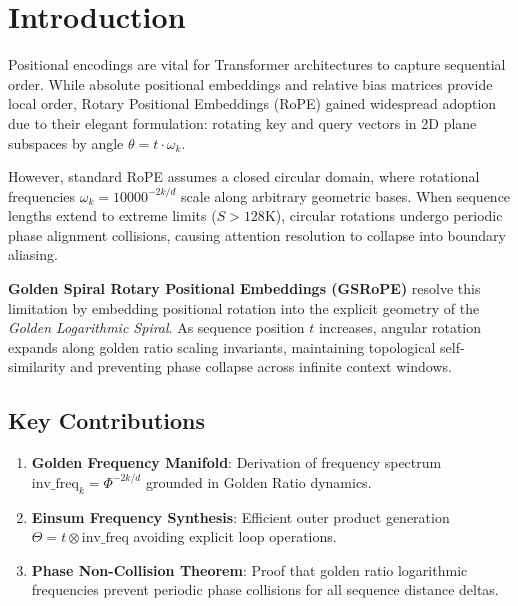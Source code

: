 \section{Introduction}
Positional encodings are vital for Transformer architectures to capture sequential order. While absolute positional embeddings and relative bias matrices provide local order, Rotary Positional Embeddings (RoPE) gained widespread adoption due to their elegant formulation: rotating key and query vectors in 2D plane subspaces by angle $\theta = t \cdot \omega_k$.

However, standard RoPE assumes a closed circular domain, where rotational frequencies $\omega_k = 10000^{-2k/d}$ scale along arbitrary geometric bases. When sequence lengths extend to extreme limits ($S > 128\text{K}$), circular rotations undergo periodic phase alignment collisions, causing attention resolution to collapse into boundary aliasing.

\textbf{Golden Spiral Rotary Positional Embeddings (GSRoPE)} resolve this limitation by embedding positional rotation into the explicit geometry of the \textit{Golden Logarithmic Spiral}. As sequence position $t$ increases, angular rotation expands along golden ratio scaling invariants, maintaining topological self-similarity and preventing phase collapse across infinite context windows.

\subsection{Key Contributions}
\begin{enumerate}[label=\textbf{\arabic*.}]
    \item \textbf{Golden Frequency Manifold}: Derivation of frequency spectrum $\text{inv\_freq}_k = \Phi^{-2k/d}$ grounded in Golden Ratio dynamics.
    \item \textbf{Einsum Frequency Synthesis}: Efficient outer product generation $\Theta = t \otimes \text{inv\_freq}$ avoiding explicit loop operations.
    \item \textbf{Phase Non-Collision Theorem}: Proof that golden ratio logarithmic frequencies prevent periodic phase collisions for all sequence distance deltas.
\end{enumerate}